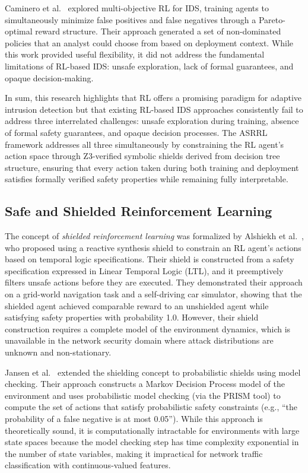\documentclass[12pt, letterpaper, oneside]{report}
\newcommand{\ASRRL}{\textsc{ASRRL}}
\begin{document}
Caminero et al.~\cite{caminero2019} explored multi-objective RL for IDS, training agents to simultaneously minimize false positives and false negatives through a Pareto-optimal reward structure. Their approach generated a set of non-dominated policies that an analyst could choose from based on deployment context. While this work provided useful flexibility, it did not address the fundamental limitations of RL-based IDS: unsafe exploration, lack of formal guarantees, and opaque decision-making.

In sum, this research highlights that RL offers a promising paradigm for adaptive intrusion detection but that existing RL-based IDS approaches consistently fail to address three interrelated challenges: unsafe exploration during training, absence of formal safety guarantees, and opaque decision processes. The \ASRRL{} framework addresses all three simultaneously by constraining the RL agent's action space through Z3-verified symbolic shields derived from decision tree structure, ensuring that every action taken during both training and deployment satisfies formally verified safety properties while remaining fully interpretable.

\subsection{Safe and Shielded Reinforcement Learning}

The concept of \emph{shielded reinforcement learning} was formalized by Alshiekh et al.~\cite{alshiekh2018}, who proposed using a reactive synthesis shield to constrain an RL agent's actions based on temporal logic specifications. Their shield is constructed from a safety specification expressed in Linear Temporal Logic (LTL), and it preemptively filters unsafe actions before they are executed. They demonstrated their approach on a grid-world navigation task and a self-driving car simulator, showing that the shielded agent achieved comparable reward to an unshielded agent while satisfying safety properties with probability 1.0. However, their shield construction requires a complete model of the environment dynamics, which is unavailable in the network security domain where attack distributions are unknown and non-stationary.

Jansen et al.~\cite{jansen2020} extended the shielding concept to probabilistic shields using model checking. Their approach constructs a Markov Decision Process model of the environment and uses probabilistic model checking (via the PRISM tool) to compute the set of actions that satisfy probabilistic safety constraints (e.g., ``the probability of a false negative is at most 0.05''). While this approach is theoretically sound, it is computationally intractable for environments with large state spaces because the model checking step has time complexity exponential in the number of state variables, making it impractical for network traffic classification with continuous-valued features.
\end{document}
